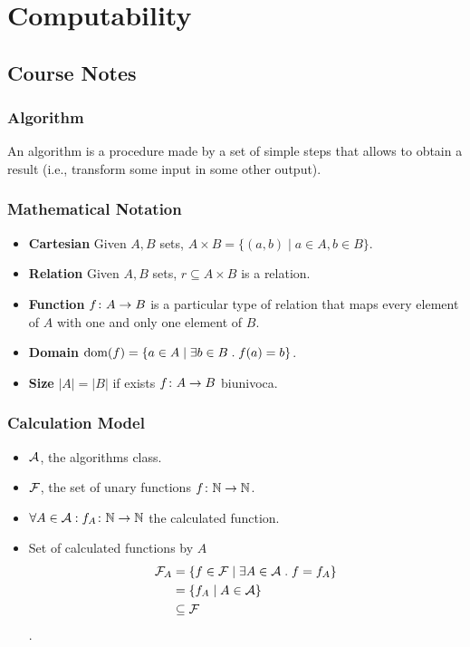 \documentclass[12pt,a4paper,oneside]{book}
\begin{document}
\chapter{Computability}

\section{Course Notes}

\subsection{Algorithm} 

An algorithm is a procedure made by a set of simple steps that allows
to obtain a result (i.e., transform some input in some other output).

\subsection{Mathematical Notation}

\begin{itemize}
    \item \textbf{Cartesian} Given $A, B$ sets, $A \times B = \{ (a,b)
      \mid a \in A, b \in B\}$.
    \item \textbf{Relation} Given $A, B$ sets, $r \subseteq A \times
      B$ is a relation.
    \item \textbf{Function} $\mathord{f}\colon A\to B$ is a particular type of
      relation that maps every element of $A$ with one and only one
      element of $B$.
    \item \textbf{Domain} $\mathop{\mathrm{dom}}\nolimits(f) = \{ a \in A \mid \exists b \in B
      \mathrel{.} f(a) = b \}$.
    \item \textbf{Size} $|A| = |B|$ if exists $\mathord{f}\colon A\to B$
      biunivoca.
\end{itemize}

\subsection{Calculation Model}

\begin{itemize}
    \item $\mathcal{A}$, the algorithms class.
    \item $\mathcal{F}$, the set of unary functions
      $\mathord{f}\colon\mathbb{N}\to\mathbb{N}$.
    \item $\forall A \in \mathcal{A} \mathrel{:} \mathord{f_A}\colon\mathbb{N}\to\mathbb{N}$ the
      calculated function.
    \item Set of calculated functions by $A$
    \begin{align*}
        \mathcal{F}_A &= \{ f \in \mathcal{F} \mid \exists A \in \mathcal{A} \mathrel{.} f = f_A \} \\ 
          &= \{ f_A \mid A \in \mathcal{A} \} \\
          &\subseteq \mathcal{F}
    \end{align*}.
\end{itemize}
\end{document}
